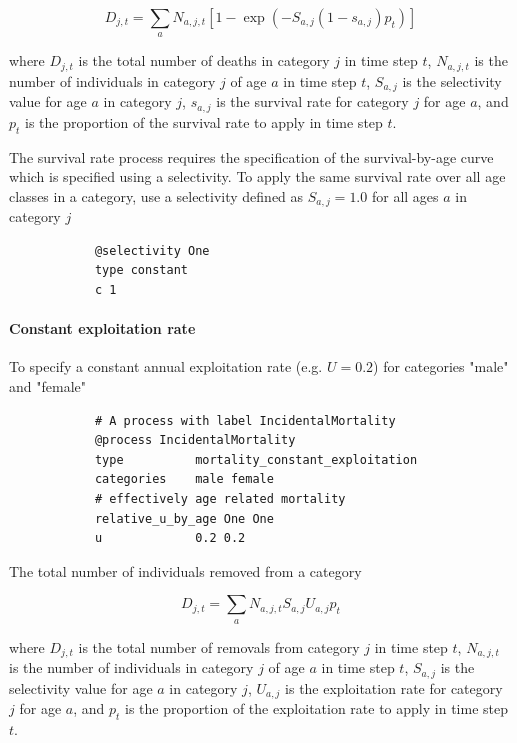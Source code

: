 \begin{equation}
	D_{j,t} = \sum_a N_{a,j,t} [1 - \exp(-S_{a,j} (1-s_{a,j}) p_t)]
\end{equation}

where $D_{j,t}$ is the total number of deaths in category $j$ in time step $t$, $N_{a,j,t}$ is the number of individuals in category $j$ of age $a$ in time step $t$, $S_{a,j}$ is the selectivity value for age $a$ in category $j$, $s_{a,j}$ is the survival rate for category $j$ for age $a$, and $p_t$ is the proportion of the survival rate to apply in time step $t$.

The survival rate process requires the specification of the survival-by-age curve which is specified using a selectivity. To apply the same survival rate over all age classes in a category, use a selectivity defined as $S_{a,j}=1.0$ for all ages $a$ in category $j$

{\small{\begin{verbatim}
			@selectivity One
			type constant
			c 1
\end{verbatim}}}

\paragraph{Constant exploitation rate}\label{sec:Process-MortalityConstantExploitation} 

To specify a constant annual exploitation rate (e.g. $U=0.2$) for categories "male" and "female"

{\small{\begin{verbatim}
			# A process with label IncidentalMortality
			@process IncidentalMortality
			type          mortality_constant_exploitation
			categories    male female
			# effectively age related mortality
			relative_u_by_age One One
			u             0.2 0.2
\end{verbatim}}}

The total number of individuals removed from a category

\begin{equation}
	D_{j,t} = \sum_a N_{a,j,t} S_{a,j} U_{a,j} p_t
\end{equation}

where $D_{j,t}$ is the total number of removals from category $j$ in time step $t$, $N_{a,j,t}$ is the number of individuals in category $j$ of age $a$ in time step $t$, $S_{a,j}$ is the selectivity value for age $a$ in category $j$, $U_{a,j}$ is the exploitation rate for category $j$ for age $a$, and $p_t$ is the proportion of the exploitation rate to apply in time step $t$.

